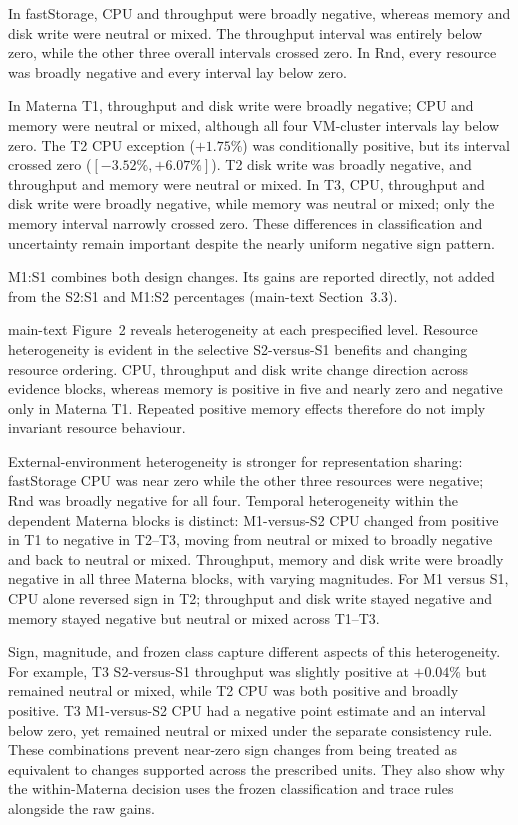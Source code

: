 \documentclass[a4paper,11pt]{article}
\begin{document}
In fastStorage, CPU and throughput were broadly negative, whereas memory and
disk write were neutral or mixed. The throughput interval was entirely below
zero, while the other three overall intervals crossed zero. In Rnd, every
resource was broadly negative and every interval lay below zero.

In Materna T1, throughput and disk write were broadly negative; CPU and memory
were neutral or mixed, although all four VM-cluster intervals lay below zero.
The T2 CPU exception ($+1.75\%$) was conditionally positive, but its interval
crossed zero ($[-3.52\%,+6.07\%]$). T2 disk write was broadly negative, and
throughput and memory were neutral or mixed. In T3, CPU, throughput and disk
write were broadly negative, while memory was neutral or mixed; only the
memory interval narrowly crossed zero. These differences in classification
and uncertainty remain important despite the nearly uniform negative sign
pattern.

M1:S1 combines both design changes. Its gains are reported directly, not
added from the S2:S1 and M1:S2 percentages (main-text Section~3.3).

main-text Figure~2 reveals heterogeneity at each prespecified
level. Resource heterogeneity is evident in the selective S2-versus-S1
benefits and changing resource ordering. CPU, throughput and disk write change
direction across evidence blocks, whereas memory is positive in five and
nearly zero and negative only in Materna T1. Repeated positive memory effects
therefore do not imply invariant resource behaviour.

External-environment heterogeneity is stronger for representation sharing: fastStorage
CPU was near zero while the other three resources were negative; Rnd was
broadly negative for all four. Temporal heterogeneity within the dependent
Materna blocks is distinct: M1-versus-S2 CPU changed from positive in T1 to
negative in T2--T3, moving from neutral or mixed to broadly negative and back
to neutral or mixed. Throughput, memory and disk write were broadly negative
in all three Materna blocks, with varying magnitudes. For M1 versus S1, CPU
alone reversed sign in T2; throughput and disk write stayed negative and
memory stayed negative but neutral or mixed across T1--T3.

Sign, magnitude, and frozen class capture different aspects of this
heterogeneity. For example, T3 S2-versus-S1 throughput was slightly positive at
$+0.04\%$ but remained neutral or mixed, while T2 CPU was both positive and
broadly positive. T3 M1-versus-S2 CPU had a negative point estimate and an
interval below zero, yet remained neutral or mixed under the separate
consistency rule. These combinations prevent near-zero sign changes from being
treated as equivalent to changes supported across the prescribed units. They
also show why the within-Materna decision uses the frozen classification and
trace rules alongside the raw gains.
\end{document}
